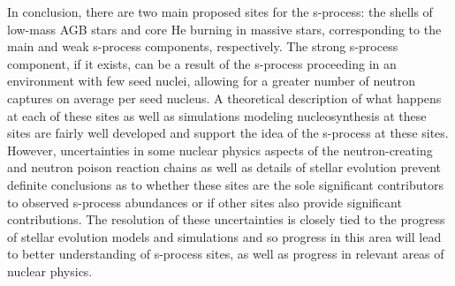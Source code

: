 In conclusion, there are two main proposed sites for the s-process:
the shells of low-mass AGB stars and core He burning in massive
stars, corresponding to the main and weak s-process components,
respectively.  The strong s-process component, if it exists, can be a
result of the s-process proceeding in an environment with few seed
nuclei, allowing for a greater number of neutron captures on average
per seed nucleus.  A theoretical description of what happens at each
of these sites as well as simulations modeling nucleosynthesis at
these sites are fairly well developed and support the idea of
the s-process at these sites.  However, uncertainties in some nuclear
physics aspects of the neutron-creating and neutron poison reaction
chains as well as details of stellar evolution prevent definite
conclusions as to whether these sites are the sole significant
contributors to observed s-process abundances or if other sites also
provide significant contributions.  The resolution of these
uncertainties is closely tied to the progress of stellar evolution
models and simulations and so progress in this area will lead to
better understanding of s-process sites, as well as progress in
relevant areas of nuclear physics.  




